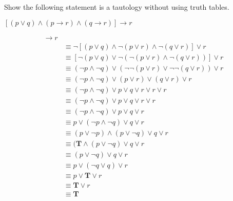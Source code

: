 \documentclass[12pt,addpoints]{exam}
\newcommand{\ra}{\rightarrow}
\begin{document}
\begin{questions}
\printanswers

\question[10] Show the following statement is a tautology without using truth tables.
\begin{center}
    $[(p \vee q) \wedge (p \ra r) \wedge (q \ra r)] \ra r$
\end{center}
    \begin{solution}
    \begin{align*}
      [(p \vee q) &\wedge ((p \ra r) \wedge (q \ra r))] \ra r \\
      &\equiv \neg[(p \vee q) \wedge \neg(p \vee r) \wedge \neg (q \vee r)] \vee r \tag{Table 7, rule 1, x3} \\
      &\equiv [\neg(p \vee q) \vee \neg(\neg(p \vee r) \wedge \neg(q \vee r))] \vee r \tag{DeMorgan's} \\
      & \equiv (\neg p \wedge \neg q) \vee (\neg \neg(p \vee r) \vee \neg \neg(q \vee r)) \vee r \tag{DeMorgan's, x2} \\
      & \equiv (\neg p \wedge \neg q) \vee (p \vee r) \vee (q \vee r) \vee r \tag{Double Negation, x2} \\
      & \equiv (\neg p \wedge \neg q) \vee p \vee q \vee r \vee r \vee r \tag{Commutative} \\
      & \equiv (\neg p \wedge \neg q) \vee p \vee q \vee r \vee r \tag{Idempotent} \\
      & \equiv (\neg p \wedge \neg q) \vee p \vee q \vee r \tag{Idempotent} \\
      & \equiv p \vee (\neg p \wedge \neg q) \vee q \vee r \tag{Commutative} \\
      & \equiv (p \vee \neg p) \wedge (p \vee \neg q) \vee q \vee r \tag{Distributive} \\
      & \equiv (\mathbf{T} \wedge (p \vee \neg q) \vee q \vee r \tag{Negation} \\
      & \equiv (p \vee \neg q) \vee q \vee r \tag{Identity} \\
      & \equiv p \vee (\neg q \vee q) \vee r \tag{Associative} \\
      & \equiv p \vee \mathbf{T} \vee r \tag{Negation} \\
      & \equiv \mathbf{T} \vee r \tag{Domination} \\
      & \equiv \mathbf{T} \tag{Domination}
    \end{align*}
    \end{solution}


\end{questions}
\end{document}
